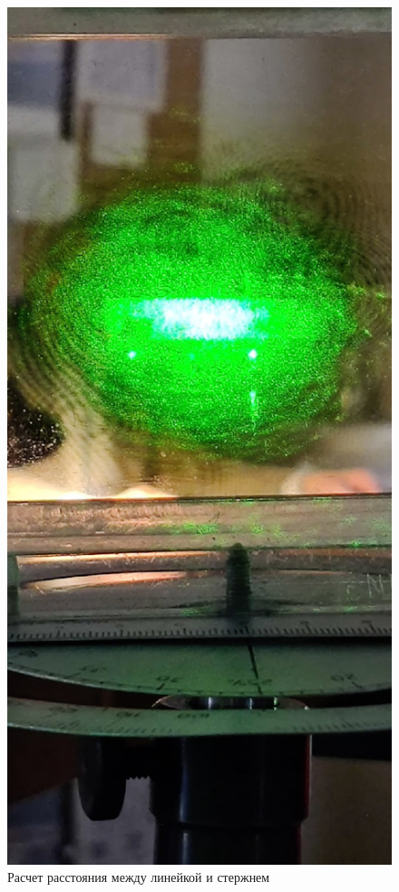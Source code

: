 \documentclass{letask}
\begin{document}
\begin{figure}[H]
	\centering
	\includegraphics[width = 0.6 \lw]{13}
	\caption{Расчет расстояния между линейкой и стержнем}
\end{figure}
\end{document}
